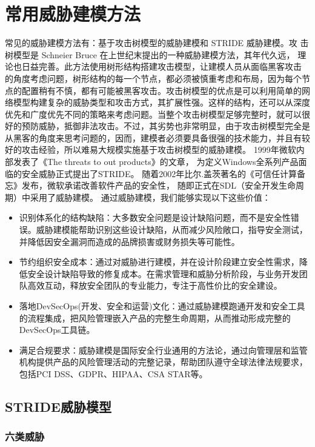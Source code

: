 \section{常用威胁建模方法}
常见的威胁建模方法有：基于攻击树模型的威胁建模和 STRIDE 威胁建模。攻
击树模型是 Schneier Bruce 在上世纪末提出的一种威胁建模方法\cite{schneier1999attack}，其年代久远，
理论也日益完善。此方法使用树形结构搭建攻击模型，让建模人员从面临黑客攻击
的角度考虑问题，树形结构的每一个节点，都必须被慎重考虑和布局，因为每个节
点的配置稍有不慎，都有可能被黑客攻击。攻击树模型的优点是可以利用简单的网
络模型构建复杂的威胁类型和攻击方式，其扩展性强。这样的结构，还可以从深度
优先和广度优先不同的策略来考虑问题。当整个攻击树模型足够完整时，就可以很
好的预防威胁，抵御非法攻击。不过，其劣势也非常明显，由于攻击树模型完全是
从黑客的角度来思考问题的，因而，建模者必须要具备很强的技术能力，并且有较
好的攻击经验，所以难易大规模实施基于攻击树模型的威胁建模。
1999年微软内部发表了《The threats to out products》\cite{kohnfelder1999threats}的文章，
为定义Windows全系列产品面临的安全威胁正式提出了STRIDE。
随着2002年比尔.盖茨著名的《可信任计算备忘》发布，微软承诺改善软件产品的安全性，
随即正式在SDL（安全开发生命周期）中采用了威胁建模。
\newline
通过威胁建模，我们能够实现以下这些价值：
\begin{itemize}
    \item 识别体系化的结构缺陷：大多数安全问题是设计缺陷问题，而不是安全性错误。威胁建模能帮助识别这些设计缺陷，从而减少风险敞口，指导安全测试，并降低因安全漏洞而造成的品牌损害或财务损失等可能性。
    \item 节约组织安全成本：通过对威胁进行建模，并在设计阶段建立安全性需求，降低安全设计缺陷导致的修复成本。在需求管理和威胁分析阶段，与业务开发团队高效互动，释放安全团队的专业能力，专注于高性价比的安全建设。
    \item 落地DevSecOps(开发、安全和运营)文化：通过威胁建模跑通开发和安全工具的流程集成，把风险管理嵌入产品的完整生命周期，从而推动形成完整的DevSecOps工具链。
    \item 满足合规要求：威胁建模是国际安全行业通用的方法论，通过向管理层和监管机构提供产品的风险管理活动的完整记录，帮助团队遵守全球法律法规要求，包括PCI DSS、GDPR、HIPAA、CSA STAR等。
  \end{itemize}

\subsection{STRIDE威胁模型}
\subsubsection{六类威胁}

